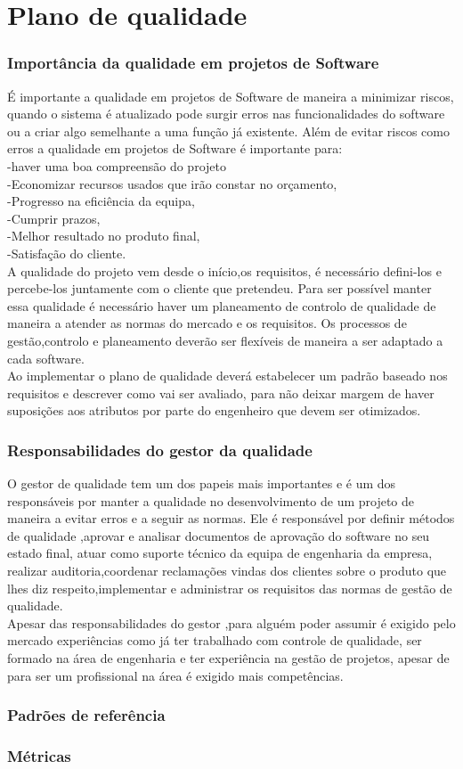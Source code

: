 \chapter{Plano de qualidade}
\label{plano_de_qualidade}

\subsection{Importância da qualidade em projetos de Software}
É importante a qualidade em projetos de Software de maneira a minimizar riscos, quando o sistema é atualizado pode surgir erros nas funcionalidades do software ou a criar algo semelhante a uma função já existente. Além de evitar riscos como erros a qualidade em projetos de Software é importante para:\\
-haver uma boa compreensão do projeto\\
-Economizar recursos usados que irão constar no orçamento,\\
-Progresso na eficiência da equipa,\\
-Cumprir prazos,\\
-Melhor resultado no produto final,\\
-Satisfação do cliente.\\
A qualidade do projeto vem desde o início,os requisitos, é necessário defini-los e percebe-los juntamente com o cliente que pretendeu. Para ser possível manter essa qualidade é necessário haver um planeamento de controlo de qualidade de maneira a atender as normas do mercado e os requisitos. Os processos de gestão,controlo e planeamento deverão ser flexíveis de maneira a ser adaptado a cada software.\\
Ao implementar o plano de qualidade deverá estabelecer um padrão baseado nos requisitos e descrever como vai ser avaliado, para não deixar margem de haver suposições aos atributos por parte do engenheiro que devem ser otimizados.
\subsection{Responsabilidades do gestor da qualidade}
O gestor de qualidade tem um dos papeis mais importantes e é um dos responsáveis por manter a qualidade no desenvolvimento de um projeto de maneira a evitar erros e a seguir as normas. Ele é responsável por definir métodos de qualidade ,aprovar e analisar documentos de aprovação do software no seu estado final, atuar como suporte técnico da equipa de engenharia da empresa, realizar auditoria,coordenar reclamações vindas dos clientes sobre o produto que lhes diz respeito,implementar e administrar os requisitos das normas de gestão de qualidade.\\
Apesar das responsabilidades do gestor ,para alguém poder assumir é exigido pelo mercado experiências como já ter trabalhado com controle de qualidade, ser formado na área de engenharia e ter experiência na gestão de projetos, apesar de para ser um profissional na área é exigido mais competências.
\subsection{Padrões de referência}

\subsection{Métricas}